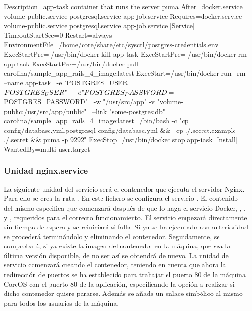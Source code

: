 \begin{codelisting}
\label{code:app-task.service}
\begin{code}
[Unit] 
  Description=app-task container that runs the server puma
  After=docker.service volume-public.service postgresql.service app-job.service
  Requires=docker.service volume-public.service postgresql.service app-job.service
[Service] 
  TimeoutStartSec=0
  Restart=always 
  EnvironmentFile=/home/core/share/etc/sysctl/postgres-credentials.env
  ExecStartPre=-/usr/bin/docker kill app-task 
  ExecStartPre=-/usr/bin/docker rm app-task
  ExecStartPre=/usr/bin/docker pull carolina/sample_app_rails_4_image:latest 
  ExecStart=/usr/bin/docker run --rm --name app-task \
  -e "POSTGRES_USER=${POSTGRES_USER}" \
  -e "POSTGRES_PASSWORD=${POSTGRES_PASSWORD}" \
  -w "/usr/src/app" -v "volume-public:/usr/src/app/public" \
  --link "some-postgres:db" carolina/sample_app_rails_4_image:latest \
  /bin/bash -c "cp config/database.yml.postgresql config/database.yml && \
  cp ./.secret.example ./.secret && puma -p 9292"
  ExecStop=/usr/bin/docker stop app-task
[Install] 
  WantedBy=multi-user.target
\end{code}
\end{codelisting}

\subsubsection{Unidad nginx.service}

La siguiente unidad del servicio será el contenedor que ejecuta el servidor Nginx. Para ello se crea la ruta . En este fichero se configura el servicio . El contenido del mismo especifica que comenzará después de que lo haga el servicio Docker, , ,  y , requeridos para el correcto funcionamiento. El servicio empezará directamente sin tiempo de espera y se reiniciará si falla. Si ya se ha ejecutado con anterioridad se procederá terminándolo y eliminando el contenedor. Seguidamente, se comprobará, si ya existe la imagen del contenedor en la máquina, que sea la última versión disponible, de no ser así se obtendrá de nuevo. La unidad de servicio comenzará creando el contenedor, teniendo en cuenta que ahora la redirección de puertos se ha establecido para trabajar el puerto 80 de la máquina CoreOS con el puerto 80 de la aplicación, especificando la opción a realizar si dicho contenedor quiere pararse. Además se añade un enlace simbólico al mismo para todos los usuarios de la máquina. 

